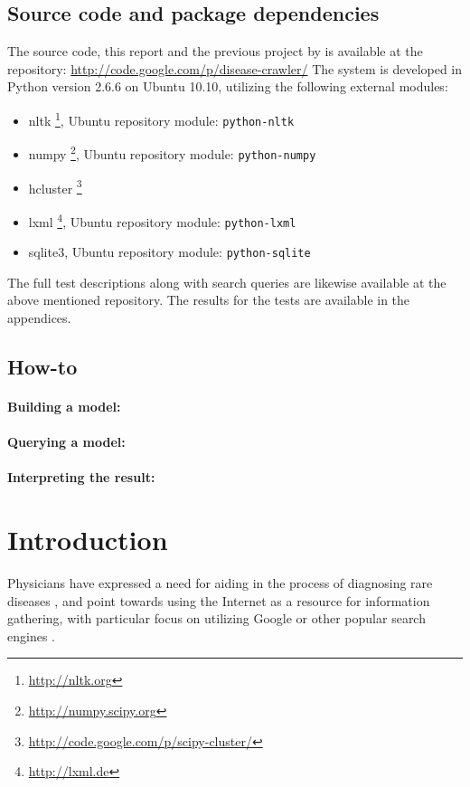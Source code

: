 \documentclass[10pt,letterpaper,final]{article}
\begin{document}
\subsection{Source code and package dependencies}
The source code, this report and the previous project by
\cite{jensenandersen} is available at the repository:
\url{http://code.google.com/p/disease-crawler/}
The system is developed in Python version 2.6.6 on Ubuntu 10.10,
utilizing the following external modules:
\begin{itemize}
\item nltk \footnote{\url{http://nltk.org}}, Ubuntu repository module: \texttt{python-nltk}
\item numpy \footnote{\url{http://numpy.scipy.org}}, Ubuntu repository module: \texttt{python-numpy}
\item hcluster \footnote{\url{http://code.google.com/p/scipy-cluster/}}
\item lxml \footnote{\url{http://lxml.de}}, Ubuntu repository module: \texttt{python-lxml}
\item sqlite3, Ubuntu repository module: \texttt{python-sqlite}
\end{itemize}

The full test descriptions along with search queries are likewise
available at the above mentioned repository. The results for the tests
are available in the appendices.

\subsection{How-to}
\paragraph{Building a model: }

\paragraph{Querying a model: }

\paragraph{Interpreting the result: }


\section{Introduction}
Physicians have expressed a need for aiding in the process of diagnosing
rare diseases \cite{googlingdiagnosis}, and point towards using the
Internet as a resource for information gathering, with particular focus
on utilizing Google or other popular search engines
\cite{googlechangemedicine} \cite{diagnosissearchengines}.
\end{document}
